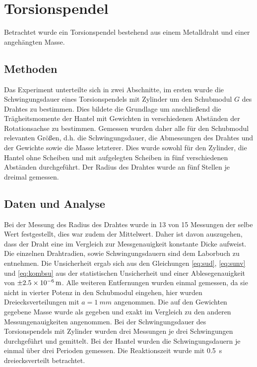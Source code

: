 \clearpage
\section{Torsionspendel}
Betrachtet wurde ein Torsionspendel bestehend aus einem Metalldraht und einer angehängten Masse.

\subsection{Methoden}
Das Experiment unterteilte sich in zwei Abschnitte, im ersten wurde die Schwingungsdauer eines Torsionspendels mit Zylinder um den Schubmodul $G$ des Drahtes zu bestimmen. Dies bildete die Grundlage um anschließend die Trägheitsmomente der Hantel mit Gewichten in verschiedenen Abständen der Rotationsachse zu bestimmen.
Gemessen wurden daher alle für den Schubmodul relevanten Größen, d.h. die Schwingungsdauer, die Abmessungen des Drahtes und der Gewichte sowie die Masse letzterer. Dies wurde sowohl für den Zylinder, die Hantel ohne Scheiben und mit aufgelegten Scheiben in fünf verschiedenen Abständen durchgeführt. Der Radius des Drahtes wurde an fünf Stellen je dreimal gemessen.


\subsection{Daten und Analyse}
 Bei der Messung des Radius des Drahtes wurde in 13 von 15 Messungen der selbe Wert festgestellt, dies war zudem der Mittelwert. Daher ist davon auszugehen, dass der Draht eine im Vergleich zur Messgenauigkeit konstante Dicke aufweist. Die einzelnen Drahtradien, sowie Schwingungsdauern sind dem Laborbuch zu entnehmen. Die Unsicherheit ergab sich aus den Gleichungen \ref{eq:sud}, \ref{eq:sunv} und \ref{eq:kombsu} aus der statistischen Unsicherheit und einer Ablesegenauigkeit von $\SI{\pm 2.5e-6}{m}$.
 Alle weiteren Entfernungen wurden einmal gemessen, da sie nicht in vierter Potenz in den Schubmodul eingehen, hier wurden Dreiecksverteilungen mit $a=\SI{1}{mm}$ angenommen. Die auf den Gewichten gegebene Masse wurde als gegeben und exakt im Vergleich zu den anderen Messungenauigkeiten angenommen. Bei der Schwingungsdauer des Torsionspendels mit Zylinder wurden drei Messungen je drei Schwingungen durchgeführt und gemittelt. Bei der Hantel wurden die Schwingungsdauern je einmal über drei Perioden gemessen. Die Reaktionszeit wurde mit \SI{0.5}{s} dreiecksverteilt betrachtet.\\
 

